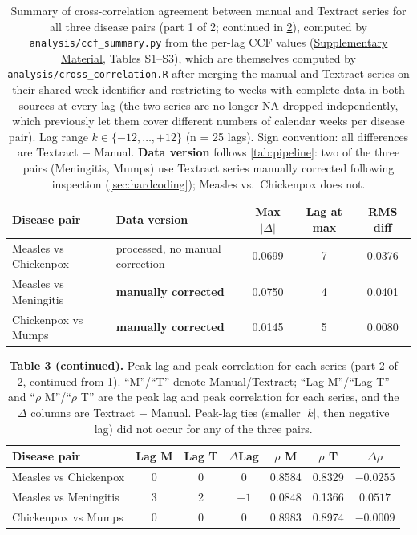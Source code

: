 \documentclass[12pt]{article}
\begin{document}
\begin{table}[h]
\centering
\small
\begin{tabular}{lp{3.3cm}ccc}
\toprule
Disease pair & Data version & Max $|\Delta|$ & Lag at max & RMS diff \\
\midrule
Measles vs Chickenpox & processed, no manual correction & 0.0699 & 7 & 0.0376 \\
Measles vs Meningitis & \textbf{manually corrected} & 0.0750 & 4 & 0.0401 \\
Chickenpox vs Mumps & \textbf{manually corrected} & 0.0145 & 5 & 0.0080 \\
\bottomrule
\end{tabular}
\caption{Summary of cross-correlation agreement between manual and Textract series for all three disease pairs (part 1 of 2; continued in \cref{tab:ccf_summary_b}), computed by \texttt{analysis/ccf\_summary.py} from the per-lag CCF values (\hyperref[sec:supp]{Supplementary Material}, Tables S1--S3), which are themselves computed by \texttt{analysis/cross\_correlation.R} after merging the manual and Textract series on their shared week identifier and restricting to weeks with complete data in both sources at every lag (the two series are no longer NA-dropped independently, which previously let them cover different numbers of calendar weeks per disease pair). Lag range $k \in \{-12,\dots,+12\}$ (n = 25 lags). Sign convention: all differences are Textract $-$ Manual. \textbf{Data version} follows \cref{tab:pipeline}: two of the three pairs (Meningitis, Mumps) use Textract series manually corrected following inspection (\cref{sec:hardcoding}); Measles vs.\ Chickenpox does not.}
\label{tab:ccf_summary}
\end{table}

\begin{table}[h]
\centering
\small
\begin{tabular}{lcccccc}
\toprule
Disease pair & Lag M & Lag T & $\Delta$Lag & $\rho$ M & $\rho$ T & $\Delta\rho$ \\
\midrule
Measles vs Chickenpox & 0 & 0 & 0 & 0.8584 & 0.8329 & $-0.0255$ \\
Measles vs Meningitis & 3 & 2 & $-1$ & 0.0848 & 0.1366 & $0.0517$ \\
Chickenpox vs Mumps & 0 & 0 & 0 & 0.8983 & 0.8974 & $-0.0009$ \\
\bottomrule
\end{tabular}
\caption*{\textbf{Table 3 (continued).} Peak lag and peak correlation for each series (part 2 of 2, continued from \cref{tab:ccf_summary}). ``M''/``T'' denote Manual/Textract; ``Lag M''/``Lag T'' and ``$\rho$ M''/``$\rho$ T'' are the peak lag and peak correlation for each series, and the $\Delta$ columns are Textract $-$ Manual. Peak-lag ties (smaller $|k|$, then negative lag) did not occur for any of the three pairs.}
\label{tab:ccf_summary_b}
\end{table}
\end{document}
